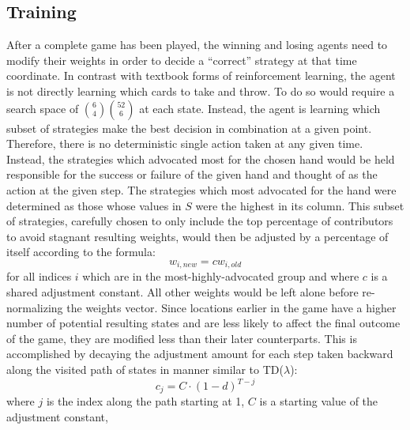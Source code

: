 
\subsection{Training}
\label{sec:dm-methods-training}




After a complete game has been played, the winning and losing agents need to
modify their weights in order to decide a ``correct'' strategy at that time
coordinate.
%
In contrast with textbook forms of reinforcement learning,
the agent is not directly learning which cards to take and throw.
%
To do so would require a search space of ${6 \choose 4}{52 \choose 6}$
at each state.
%
Instead, the agent is learning which subset of strategies make the best
decision in combination at a given point.
%
Therefore, there is no deterministic single action taken at any given
time.
%
Instead, the strategies which advocated most for the chosen hand would be held
responsible for the success or failure of the given hand and thought of as
the action at the given step.
%
The strategies which most advocated for the hand were determined as those whose
values in $S$ were the highest in its column.
%
This subset of strategies,
carefully chosen to only include the top percentage of contributors
to avoid stagnant resulting weights,
would then be adjusted by a percentage of itself according to the formula:
\[
	w_{i,new} = c w_{i,old}
\]
for all indices $i$ which are in the most-highly-advocated group and
where $c$ is a shared adjustment constant.
%
All other weights would be left alone before re-normalizing the weights vector.
%
Since locations earlier in the game have a higher number of potential resulting
states and are less likely to affect the final outcome of the game,
they are modified less than their later counterparts.
%
This is accomplished by decaying the adjustment amount for each step taken
backward along the visited path of states in manner similar to TD($\lambda$):
\[
	c_j = C \cdot (1 - d)^{T-j}
\]
where $j$ is the index along the path starting at 1,
$C$ is a starting value of the adjustment constant,
